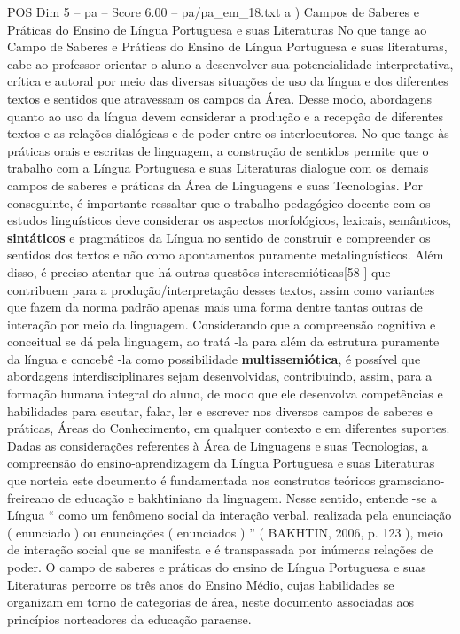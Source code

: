 \begin{textsample}{POS Dim 5 – pa – Score 6.00 – pa/pa\_em\_18.txt}  \label{ex:f5_pos_242}
a ) Campos de Saberes e Práticas do Ensino de Língua Portuguesa e suas Literaturas No que tange ao Campo de Saberes e Práticas do Ensino de Língua Portuguesa e suas literaturas, cabe ao professor orientar o aluno a desenvolver sua potencialidade interpretativa, crítica e autoral por meio das diversas situações de uso da língua e dos diferentes textos e sentidos que atravessam os campos da Área.
Desse modo, abordagens quanto ao uso da língua devem considerar a produção e a recepção de diferentes textos e as relações dialógicas e de poder entre os interlocutores.
No que tange às práticas orais e escritas de linguagem, a construção de sentidos permite que o trabalho com a Língua Portuguesa e suas Literaturas dialogue com os demais campos de saberes e práticas da Área de Linguagens e suas Tecnologias.
Por conseguinte, é importante ressaltar que o trabalho pedagógico docente com os estudos linguísticos deve considerar os aspectos morfológicos, lexicais, semânticos, \textbf{sintáticos} e pragmáticos da Língua no sentido de construir e compreender os sentidos dos textos e não como apontamentos puramente metalinguísticos.
Além disso, é preciso atentar que há outras questões intersemióticas[58 ] que contribuem para a produção/interpretação desses textos, assim como variantes que fazem da norma padrão apenas mais uma forma dentre tantas outras de interação por meio da linguagem.
Considerando que a compreensão cognitiva e conceitual se dá pela linguagem, ao tratá -la para além da estrutura puramente da língua e concebê -la como possibilidade \textbf{multissemiótica}, é possível que abordagens interdisciplinares sejam desenvolvidas, contribuindo, assim, para a formação humana integral do aluno, de modo que ele desenvolva competências e habilidades para escutar, falar, ler e escrever nos diversos campos de saberes e práticas, Áreas do Conhecimento, em qualquer contexto e em diferentes suportes.
Dadas as considerações referentes à Área de Linguagens e suas Tecnologias, a compreensão do ensino-aprendizagem da Língua Portuguesa e suas Literaturas que norteia este documento é fundamentada nos construtos teóricos gramsciano-freireano de educação e bakhtiniano da linguagem.
Nesse sentido, entende -se a Língua “ como um fenômeno social da interação verbal, realizada pela enunciação ( enunciado ) ou enunciações ( enunciados ) ” ( BAKHTIN, 2006, p. 123 ), meio de interação social que se manifesta e é transpassada por inúmeras relações de poder.
O campo de saberes e práticas do ensino de Língua Portuguesa e suas Literaturas percorre os três anos do Ensino Médio, cujas habilidades se organizam em torno de categorias de área, neste documento associadas aos princípios norteadores da educação paraense.

\end{textsample}
